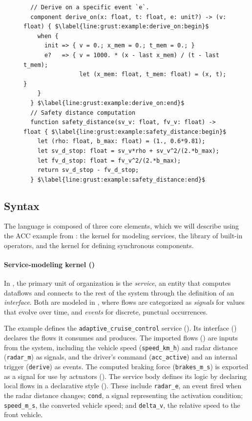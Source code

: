 \begin{figure}[ht!]
\begin{lstlisting}
  // Derive on a specific event `e`.
  component derive_on(x: float, t: float, e: unit?) -> (v: float) { $\label{line:grust:example:derive_on:begin}$
    when {
      init => { v = 0.; x_mem = 0.; t_mem = 0.; }
      e?   => { v = 1000. * (x - last x_mem) / (t - last t_mem);
                let (x_mem: float, t_mem: float) = (x, t); }
    }
  } $\label{line:grust:example:derive_on:end}$
  // Safety distance computation
  function safety_distance(sv_v: float, fv_v: float) -> float { $\label{line:grust:example:safety_distance:begin}$
    let (rho: float, b_max: float) = (1., 0.6*9.81);
    let sv_d_stop: float = sv_v*rho + sv_v^2/(2.*b_max);
    let fv_d_stop: float = fv_v^2/(2.*b_max);
    return sv_d_stop - fv_d_stop;
  } $\label{line:grust:example:safety_distance:end}$
  \end{lstlisting}
\end{figure}

\subsection{Syntax}

The \GRust language is composed of three core elements, which we will describe using
the ACC example from : the \GRFRP kernel for modeling services,
the \GReact library of built-in operators, and the \GRSync kernel for defining
synchronous components.

\paragraph{Service-modeling kernel (\GRFRP)}
In \GRust, the primary unit of organization is the \emph{service}, an entity that
computes dataflows and connects to the rest of the system through the definition of an
\emph{interface}. Both are modeled in \GRFRP, where flows are categorized as
\emph{signals} for values that evolve over time, and \emph{events} for discrete,
punctual occurrences.

The example defines the \texttt{adaptive\_cruise\_control} service
().
Its interface
()
declares the flows it consumes and produces.
%
The imported flows
()
are inputs from the system, including the vehicle speed (\texttt{speed\_km\_h}) and
radar distance (\texttt{radar\_m}) as signals, and the driver's command
(\texttt{acc\_active}) and an internal trigger (\texttt{derive}) as events.
%
The computed braking force (\texttt{brakes\_m\_s}) is exported as a signal for use by
actuators ().
%
The service body defines its logic by declaring local flows in a declarative style
(). These include
\texttt{radar\_e}, an event fired when the radar distance changes; \texttt{cond}, a
signal representing the activation condition; \texttt{speed\_m\_s}, the converted
vehicle speed; and \texttt{delta\_v}, the relative speed to the front vehicle.


